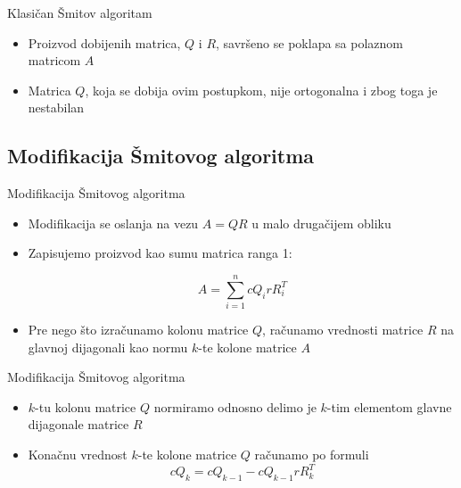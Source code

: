 \documentclass[serbian]{beamer}
\begin{document}
\begin{frame}{Klasičan Šmitov algoritam}
	
	\begin{itemize}
		\item Proizvod dobijenih matrica, $Q$ i $R$, savršeno se poklapa sa polaznom matricom $A$
		\item Matrica $Q$, koja se dobija ovim postupkom, nije ortogonalna i zbog toga je nestabilan
	\end{itemize}
	
\end{frame}

\subsection{Modifikacija Šmitovog algoritma}
\begin{frame}{Modifikacija Šmitovog algoritma}

	\begin{itemize}
		\item Modifikacija se oslanja na vezu $A = QR$ u malo drugačijem obliku
		\item Zapisujemo proizvod kao sumu matrica ranga 1:
		
		$$A = \sum_{i=1}^{n} cQ_irR_i^T $$
		
		\item Pre nego što izračunamo kolonu matrice $Q$, računamo vrednosti matrice $R$ na glavnoj dijagonali kao normu $k$-te kolone matrice $A$	
	\end{itemize}

\end{frame}

\begin{frame}{Modifikacija Šmitovog algoritma}

	\begin{itemize}
		\item  $k$-tu kolonu matrice $Q$ normiramo odnosno delimo je $k$-tim elementom glavne dijagonale matrice $R$
		\item Konačnu vrednost $k$-te kolone matrice $Q$ računamo po formuli
		$$cQ_k = cQ_{k-1} - cQ_{k-1}rR_k^T$$	
	\end{itemize}
\end{frame}
\end{document}
